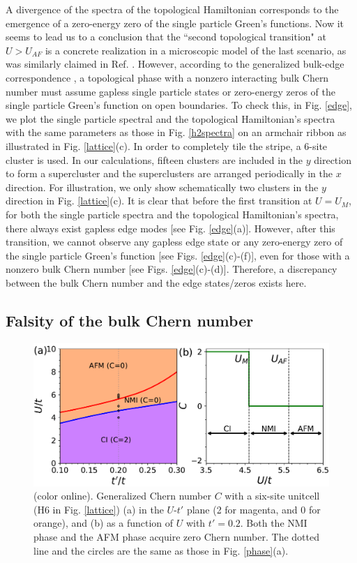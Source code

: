 \documentclass[12pt]{iopart}
\begin{document}
\par A divergence of the spectra of the topological Hamiltonian corresponds to the emergence of a zero-energy zero of the single particle Green's functions. Now it seems to lead us to a conclusion that the ``second topological transition" at $U>U_{AF}$ is a concrete realization in a microscopic model of the last scenario, as was similarly claimed in Ref. \cite{WFSM_PRB2016}. However, according to the generalized bulk-edge correspondence \cite{G_PRB2011,EG_PRB2011}, a topological phase with a nonzero interacting bulk Chern number must assume gapless single particle states or zero-energy zeros of the single particle Green's function on open boundaries. To check this, in Fig. \ref{edge}, we plot the single particle spectral and the topological Hamiltonian's spectra with the same parameters as those in Fig. \ref{h2spectra} on an armchair ribbon as illustrated in Fig. \ref{lattice}(c). In order to completely tile the stripe, a 6-site cluster is used. In our calculations, fifteen clusters are included in the $y$ direction to form a supercluster and the superclusters are arranged periodically in the $x$ direction. For illustration, we only show schematically two clusters in the $y$ direction in Fig. \ref{lattice}(c). It is clear that before the first transition at $U=U_M$, for both the single particle spectra and the topological Hamiltonian's spectra, there always exist gapless edge modes [see Fig. \ref{edge}(a)]. However, after this transition, we cannot observe any gapless edge state or any zero-energy zero of the single particle Green's function [see Figs. \ref{edge}(c)-(f)], even for those with a nonzero bulk Chern number [see Figs. \ref{edge}(c)-(d)]. Therefore, a discrepancy between the bulk Chern number and the edge states/zeros exists here.

\subsection{Falsity of the bulk Chern number}

\begin{figure}
\centering
\includegraphics[scale=0.6]{h6chernnumber}
\caption{(color online). Generalized Chern number $C$ with a six-site unitcell (H6 in Fig. \ref{lattice}) (a) in the $U$-$t'$ plane (2 for magenta, and 0 for orange), and (b) as a function of $U$ with $t'=0.2$. Both the NMI phase and the AFM phase acquire zero Chern number. The dotted line and the circles are the same as those in Fig. \ref{phase}(a).}\label{h6chernnumber}
\end{figure}
\end{document}
